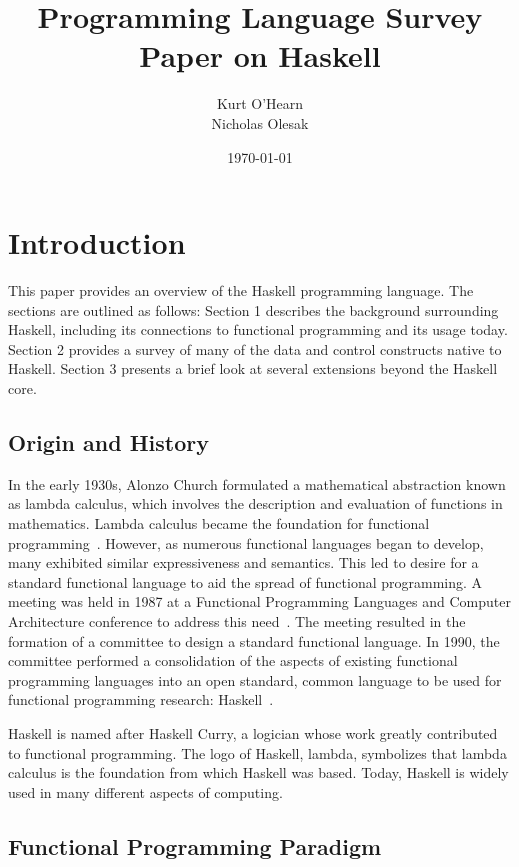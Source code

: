 \documentclass[titlepage,12pt]{article}
\title{Programming Language Survey Paper on Haskell}
\author{
        Kurt O'Hearn\\
        Nicholas Olesak\\
}
\date{\today}
\begin{document}
\maketitle 
\setcounter{tocdepth}{3}
\tableofcontents \newpage


\section{Introduction}
This paper provides an overview of the Haskell programming language.  The sections are outlined as follows:
Section 1 describes the background surrounding Haskell, including its connections to functional programming
and its usage today.  Section 2 provides a survey of many of the data and control constructs native to Haskell.
Section 3 presents a brief look at several extensions beyond the Haskell core.

\subsection{Origin and History}

In the early 1930s, Alonzo Church formulated a mathematical abstraction known as lambda calculus, which involves the description 
and evaluation of functions in mathematics. Lambda calculus became the foundation for functional programming~\cite{haskell-wiki}. 
However, as numerous functional languages began to develop, many exhibited similar expressiveness and semantics.  This led to
desire for a standard functional language to aid the spread of functional programming. A meeting was held 
in 1987 at a Functional Programming Languages and Computer Architecture conference to address this need~\cite{hudak-hist}. The meeting 
resulted in the formation of a committee to design a standard functional language. In 1990, the committee performed 
a consolidation of the aspects of existing functional programming languages into an open standard, common language to be used for 
functional programming research: Haskell~\cite{hudak-con}.

Haskell is named after Haskell Curry, a logician whose work greatly contributed to functional programming. The logo of Haskell, lambda,
symbolizes that lambda calculus is the foundation from which Haskell was based. Today, Haskell is widely used in many different aspects 
of computing.

\subsection{Functional Programming Paradigm}
\end{document}
